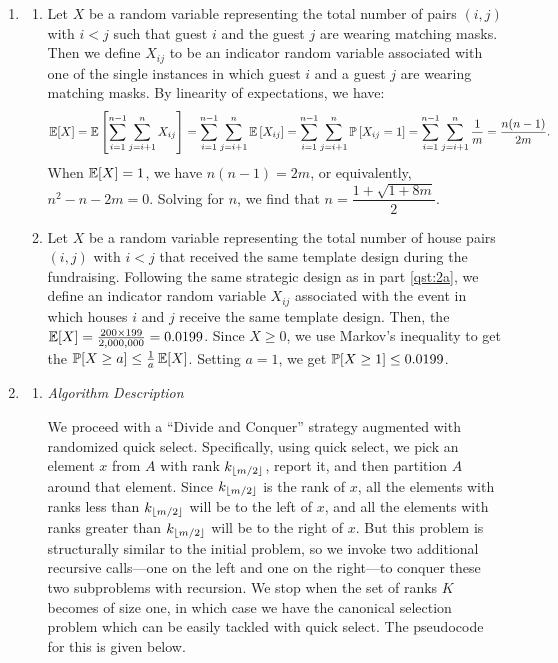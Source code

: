 \documentclass{article}
\begin{document}
\begin{enumerate}[leftmargin={*}, font={\bf}, label={\arabic*.}, ref={\arabic*}]
  \item \label{qst:2}
    \begin{enumerate}[ref={(\alph*)}]
      \item \label{qst:2a}
        Let $X$ be a random variable representing the total number of pairs $(i, j)$ with $i < j$
        such that guest $i$ and the guest $j$ are wearing matching masks. Then we define $X_{ij}$
        to be an indicator random variable associated with one of the single instances in which
        guest $i$ and a guest $j$ are wearing matching masks. By linearity of expectations, we have:
        \[
          \E[X] = \E\left[\sum_{i=1}^{n-1} \sum_{j=i+1}^{n} X_{ij}\right]
                = \sum_{i=1}^{n-1} \sum_{j=i+1}^{n} \E\left[X_{ij}\right]
                = \sum_{i=1}^{n-1} \sum_{j=i+1}^{n} \P\left[X_{ij} = 1\right]
                = \sum_{i=1}^{n-1} \sum_{j=i+1}^{n} \frac{1}{m} 
                = \frac{n(n-1)}{2m}.
       \]
        When $\E[X] = 1$, we have $n(n-1) = 2m$, or equivalently, $n^2 - n - 2m = 0$. Solving for
        $n$, we find that $n = \dfrac{1 + \sqrt{1+8m}}{2}$.

      \item \label{qst:2b}
        Let $X$ be a random variable representing the total number of house pairs $(i,j)$ with $i
        < j$ that received the same template design during the fundraising. Following the same
        strategic design as in part \ref{qst:2a}, we define an indicator random variable $X_{ij}$
        associated with the event in which houses $i$ and $j$ receive the same template design.
        Then, the $\E[X] = \frac{200 \times 199}{2,000,000} = 0.0199$. Since $X \geq 0$, we use
        Markov's inequality to get the $\P[X \geq a] \leq \frac{1}{a}\E[X]$. Setting $a = 1$, we
        get $\P[X \geq 1] \leq 0.0199$.
    \end{enumerate}

  \item \label{qst:3}
    \begin{enumerate}
      \item \label{qst:3a}
        {\itshape Algorithm Description}

        We proceed with a ``Divide and Conquer'' strategy augmented with randomized quick select.
        Specifically, using quick select, we pick an element $x$ from $A$ with rank $k_{\floor{m/2}}$,
        report it, and then partition $A$ around that element. Since $k_{\floor{m/2}}$ is the rank
        of $x$, all the elements with ranks less than $k_{\floor{m/2}}$ will be to the left of $x$,
        and all the elements with ranks greater than $k_{\floor{m/2}}$ will be to the right of $x$.
        But this problem is structurally similar to the initial problem, so we invoke two additional
        recursive calls---one on the left and one on the right---to conquer these two subproblems with
        recursion.  We stop when the set of ranks $K$ becomes of size one, in which case we have the
        canonical selection problem which can be easily tackled with quick select. The pseudocode for
        this is given below.


\end{enumerate}
\end{enumerate}
\end{document}
